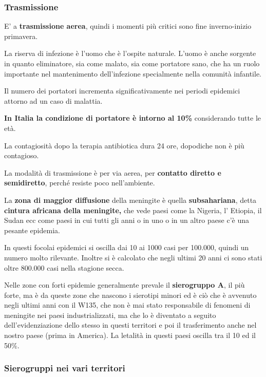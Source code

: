 \subsubsection{Trasmissione}

  E' a \textbf{trasmissione aerea}, quindi i momenti più critici sono
  fine inverno-inizio primavera.

  La riserva di infezione è l'uomo che è l'ospite naturale. L'uomo è
  anche sorgente in quanto eliminatore, sia come malato, sia come
  portatore sano, che ha un ruolo importante nel mantenimento
  dell'infezione specialmente nella comunità infantile.

  Il numero dei portatori incrementa significativamente nei periodi
  epidemici attorno ad un caso di malattia.

  \textbf{In Italia la condizione di portatore è intorno al 10\%}
  considerando tutte le età.

  La contagiosità dopo la terapia antibiotica dura 24 ore, dopodiche non
  è più contagioso.

  La modalità di trasmissione è per via aerea, per \textbf{contatto
  diretto e semidiretto}, perché resiste poco nell'ambiente.

  La \textbf{zona di maggior diffusione} della meningite è quella
  \textbf{subsahariana}, detta \textbf{cintura africana della
  meningite,} che vede paesi come la Nigeria, l' Etiopia, il Sudan ecc
  come paesi in cui tutti gli anni o in uno o in un altro paese c'è una
  pesante epidemia.

  In questi focolai epidemici si oscilla dai 10 ai 1000 casi per
  100.000, quindi un numero molto rilevante. Inoltre si è calcolato che
  negli ultimi 20 anni ci sono stati oltre 800.000 casi nella stagione
  secca.

  Nelle zone con forti epidemie generalmente prevale il
  \textbf{sierogruppo A}, il più forte, ma è da queste zone che nascono
  i sierotipi minori ed è ciò che è avvenuto negli ultimi anni con il
  W135, che non è mai stato responsabile di fenomeni di meningite nei
  paesi industrializzati, ma che lo è diventato a seguito
  dell'evidenziazione dello stesso in questi territori e poi il
  trasferimento anche nel nostro paese (prima in America). La letalità
  in questi paesi oscilla tra il 10 ed il 50\%.

\subsubsection{Sierogruppi nei vari territori}


